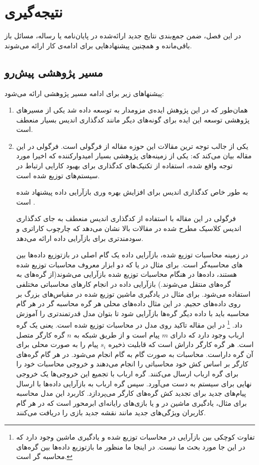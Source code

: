 \chapter{نتیجه‌گیری}
در این فصل، ضمن جمع‌بندی نتایج جدید ارائه‌شده در پایان‌نامه یا رساله،
مسائل باز باقی‌مانده و همچنین پیشنهادهایی برای ادامه‌ی کار ارائه می‌شوند.


\section{مسیر پژوهشی پیش‌رو}
پیشنهاهای زیر برای ادامه مسیر پژوهشی ارائه می‌شود:
\begin{enumerate}
	\item 
	همان‌طور که در این پژوهش ایده‌ی مزومدار به 
	\picod
	توسعه داده شد یکی از مسیرهای پژوهشی توسعه این ایده برای گونه‌های دیگر مانند کدگذاری اندیس بسیار منعطف است.
	\item 
	یکی از جالب توجه ترین مقالات این حوزه مقاله
	\cite{datashuf}
	از فرگولی است. فرگولی در این مقاله بیان می‌کند که: یکی از زمینه‌های پژوهشی بسیار امیدوارکننده که اخیرا مورد توجه واقع شده، استفاده از تکنیک‌های کدگذاری برای بهبود کارایی ارتباط در سیستم‌های توزیع شده است.
	\cite{Li2015CodedM, 7841903, 8002642, 8051074}
	
	به طور خاص کدگذاری اندیس برای افزایش بهره وری بازآرایی داده پیشنهاد شده است
	\cite{8002642, 8051074}. 

فرگولی در این مقاله با استفاده از کدگذاری اندیس منعطف به جای کدگذاری اندیس کلاسیک مطرح شده در مقالات بالا نشان می‌دهد که 
\picod
چارچوب کاراتری و سودمندتری برای بازآرایی داده ارائه می‌دهد.

در زمینه محاسبات توزیع شده، بازآرایی داده یک گام اصلی در بازتوزیع داده‌ها بین 
های محاسبه‌گر است. برای مثال در
یا
که دو ابزار معروف محاسبات توزیع شده هستند، داده‌ها در هنگام محاسبات توزیع شده بازآرایی می‌شوند(از گره‌های 
 به گره‌های 
 منتقل می‌شوند.) بازآرایی داده در انجام کارهای محاسباتی مختلفی استفاده می‌شود. برای مثال در یادگیری ماشین توزیع شده در مقیاس‌های بزرگ بر روی داده‌های حجیم. در این مثال داده‌های محلی هر گره محاسبه گر در هر گام محاسبه باید با داده دیگر گره‌ها بازآرایی شود تا بتوان مدل قدرتمندتری را آموزش داد.
 \footnote{تفاوت کوچکی بین بازآرایی در محاسبات توزیع شده و یادگیری ماشین وجود دارد که در این جا مورد بحث ما نیست. در اینجا ما منظور ما بازتوزیع داده‌ها بین گره‌های محاسبه گر است.}
 در این مقاله تاکید روی مدل
 در محاسبات توزیع شده است. یعنی یک گره ارباب وجود دارد که دارای
 $m$
 پیام است و از طریق شبکه به
 $n$
 گره کارگر متصل است. هر گره کارگر داراش
 است که قابلیت ذخیره
 $s_i$
پیام را به صورت محلی برای آن گره داراست. محاسبات به صورت گام به گام انجام می‌شود. در هر گام گره‌های کارگر بر اساس کش خود محاسباتی را انجام می‌دهند و خروجی محاسبات خود را برای گره ارباب ارسال می‌کنند. گره ارباب با تجمیع این خروجی‌ها یک خروجی نهایی برای سیستم به دست می‌آورد. سپس گره ارباب به بازآرایی داده‌ها با ارسال پیام‌های جدید برای تجدید کش گره‌های کارگر می‌پردازد. کاربرد این مدل محاسبه برای مثال، یادگیری ماشین در 
و یا بازی‌های رایانه‌ای ابرمحور است که در هر گام کاربران ویژگی‌های جدید مانند نقشه جدید بازی را دریافت می‌کنند.


\end{enumerate}
